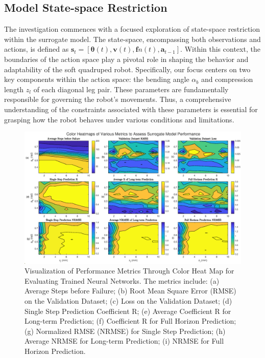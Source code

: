 \subsection{Model State-space Restriction}
The investigation commences with a focused exploration of state-space restriction within the surrogate model. The state-space, encompassing both observations and actions, is defined as $\mathbf{s}_t = [\mathbf{\theta}(t), \mathbf{v}(t), \mathbf{f}n(t), \mathbf{a}_{t-1}]$. Within this context, the boundaries of the action space play a pivotal role in shaping the behavior and adaptability of the soft quadruped robot. Specifically, our focus centers on two key components within the action space: the bending angle $\alpha_b$ and compression length $z_l$ of each diagonal leg pair. These parameters are fundamentally responsible for governing the robot's movements. Thus, a comprehensive understanding of the constraints associated with these parameters is essential for grasping how the robot behaves under various conditions and limitations.
\begin{figure}[htb]
    \centering
    \includegraphics[width=\linewidth]{img/chap5/NN_heat.eps}
    \caption{Visualization of Performance Metrics Through Color Heat Map for Evaluating Trained Neural Networks. The metrics include: (a) Average Steps before Failure; (b) Root Mean Square Error (RMSE) on the Validation Dataset; (c) Loss on the Validation Dataset; (d) Single Step Prediction Coefficient R; (e) Average Coefficient R for Long-term Prediction; (f) Coefficient R for Full Horizon Prediction; (g) Normalized RMSE (NRMSE) for Single Step Prediction; (h) Average NRMSE for Long-term Prediction; (i) NRMSE for Full Horizon Prediction.}
    \label{fig:NN_heat}
\end{figure}

